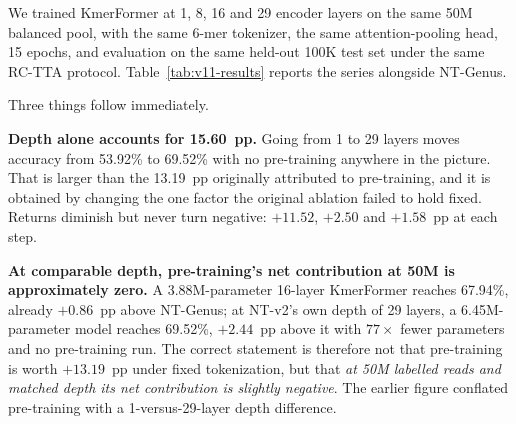 We trained KmerFormer at 1, 8, 16 and 29 encoder layers on the same 50M balanced pool, with the same 6-mer tokenizer, the same attention-pooling head, 15 epochs, and evaluation on the same held-out 100K test set under the same RC-TTA protocol. Table~\ref{tab:v11-results} reports the series alongside NT-Genus.

\begin{table}[htbp]
    \centering
    \caption{Depth sweep at a fixed 6-mer tokenizer, all arms trained on 50M balanced reads and scored on the same held-out 100K test set with RC TTA. Parameter counts are totals and include the token-embedding table. The single-layer row is the arm reported in earlier sections as the shallow from-scratch baseline; its 53.92\% here and the 53.88\% of the internal validation split agree to within 0.04~pp, so the two pools are interchangeable at this resolution.}
    \label{tab:v11-results}
\end{table}

Three things follow immediately.

\textbf{Depth alone accounts for 15.60~pp.} Going from 1 to 29 layers moves accuracy from 53.92\% to 69.52\% with no pre-training anywhere in the picture. That is larger than the 13.19~pp originally attributed to pre-training, and it is obtained by changing the one factor the original ablation failed to hold fixed. Returns diminish but never turn negative: $+11.52$, $+2.50$ and $+1.58$~pp at each step.

\textbf{At comparable depth, pre-training's net contribution at 50M is approximately zero.} A 3.88M-parameter 16-layer KmerFormer reaches 67.94\%, already $+0.86$~pp above NT-Genus; at NT-v2's own depth of 29 layers, a 6.45M-parameter model reaches 69.52\%, $+2.44$~pp above it with $77\times$ fewer parameters and no pre-training run. The correct statement is therefore not that pre-training is worth $+13.19$~pp under fixed tokenization, but that \emph{at 50M labelled reads and matched depth its net contribution is slightly negative}. The earlier figure conflated pre-training with a 1-versus-29-layer depth difference.


